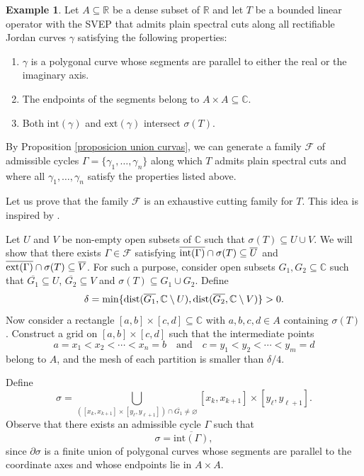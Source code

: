 \documentclass[11pt]{amsart}
\theoremstyle{definition}
\newtheorem{example}[theorem]{Example}
\theoremstyle{remark}
\numberwithin{equation}{section}
\newcommand{\C}{\mathbb{C}}
\newcommand{\inte}{\textnormal{int}}
\newcommand{\exte}{\textnormal{ext}}
\begin{document}
\begin{example}\label{ejemplo 1}
Let $A\subseteq \mathbb{R}$ be a dense subset of $\mathbb{R}$ and let $T$ be a bounded linear operator with the SVEP that admits plain spectral cuts along all rectifiable Jordan curves $\gamma$ satisfying the following properties:
\begin{enumerate}
    \item[(i)] $\gamma$ is a polygonal curve whose segments are parallel to either the real or the imaginary axis.
    \item[(ii)] The endpoints of the segments belong to $A\times A\subseteq \mathbb{C}$.
    \item[(iii)] Both $\mathrm{int}(\gamma)$ and $\mathrm{ext}(\gamma)$ intersect $\sigma(T)$.
\end{enumerate}

By Proposition \ref{proposicion union curvas}, we can generate a family $\mathcal{F}$ of admissible cycles $\Gamma=\{\gamma_1,\ldots,\gamma_n\}$ along which $T$ admits  plain spectral cuts and where all $\gamma_1,\ldots,\gamma_n$ satisfy the properties listed above.

\smallskip

Let us prove that the family $\mathcal{F}$ is an exhaustive cutting family for $T$. This idea is inspired by \cite[Theorem 3.2]{FJKP11}.


\smallskip

Let $U$ and $V$ be non-empty open subsets of $\C$ such that $\sigma(T)\subseteq   U\cup V$. We will show that there exists $\Gamma\in \mathcal{F}$ satisfying $\overline{\inte(\Gamma)}\cap \sigma(T) \subseteq  \overline{U}$ and $\overline{\exte(\Gamma)}\cap \sigma(T) \subseteq  \overline{V}$.  For such a purpose, consider open subsets $G_1,G_2\subseteq  \C$ such that $\overline{G_1}\subseteq   U$, $\overline{G_2}\subseteq   V$ and $\sigma(T)\subseteq   G_1\cup G_2$.
Define
$$
\delta = \min \{\textnormal{dist}(\overline{G_1},\C\setminus U), \textnormal{dist}(\overline{G_2},\C\setminus V)\}>0.
$$
Now consider a rectangle $[a,b]\times [c,d]\subseteq \mathbb{C}$ with $a,b,c,d\in A$ containing $\sigma(T)$. Construct a grid on $[a,b]\times [c,d]$ such that the intermediate points
$$
a=x_1<x_2<\cdots<x_n=b \quad \text{and} \quad c=y_1<y_2<\cdots<y_m=d
$$
belong to $A$, and the mesh of each partition is smaller than $\delta/4$.

Define
$$
\sigma=\bigcup_{([x_k,x_{k+1}]\times [y_\ell,y_{\ell+1}])\cap \overline{G_1}\neq \varnothing}
[x_k,x_{k+1}]\times [y_\ell,y_{\ell+1}].
$$
Observe that there exists an admissible cycle $\Gamma$ such that
$$
\sigma=\overline{\mathrm{int}(\Gamma)},
$$
since $\partial\sigma$ is a finite union of polygonal curves whose segments are parallel to the coordinate axes and whose endpoints lie in $A\times A$.


\end{example}
\end{document}
